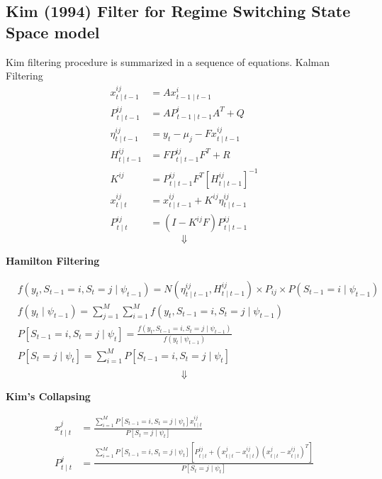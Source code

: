 \documentclass[UTF8,12pt]{ctexart}
\numberwithin{equation}{section}%
\begin{document}
	\subsection{Kim (1994) Filter for Regime Switching State Space model}
	Kim filtering procedure is summarized in a sequence of equations.
	Kalman Filtering
	$$
	\begin{aligned}
		x_{t \mid t-1}^{i j} & =A x_{t-1 \mid t-1}^i \\
		P_{t \mid t-1}^{i j} & =A P_{t-1 \mid t-1}^i A^T+Q \\
		\eta_{t \mid t-1}^{i j} & =y_t-\mu_j-F x_{t \mid t-1}^{i j} \\
		H_{t \mid t-1}^{i j} & =F P_{t \mid t-1}^{i j} F^T+R \\
		K^{i j} & =P_{t \mid t-1}^{i j} F^T\left[H_{t \mid t-1}^{i j}\right]^{-1} \\
		x_{t \mid t}^{i j} & =x_{t \mid t-1}^{i j}+K^{i j} \eta_{t \mid t-1}^{i j} \\
		P_{t \mid t}^{i j} & =\left(I-K^{i j} F\right) P_{t \mid t-1}^{i j} 
	\end{aligned}
	$$
	$$\Downarrow$$
	\begin{center}
		\textbf{Hamilton Filtering}
	\end{center}
	$$
	\begin{aligned}
		& f\left(y_t, S_{t-1}=i, S_t=j \mid \psi_{t-1}\right)=N\left(\eta_{t \mid t-1}^{i j}, H_{t \mid t-1}^{i j}\right) \times P_{i j} \times P\left(S_{t-1}=i \mid \psi_{t-1}\right) \\
		& f\left(y_t \mid \psi_{t-1}\right)=\sum_{j=1}^M \sum_{i=1}^M f\left(y_t, S_{t-1}=i, S_t=j \mid \psi_{t-1}\right) \\
		& P\left[S_{t-1}=i, S_t=j \mid \psi_t\right]=\frac{f\left(y_t, S_{t-1}=i, S_t=j \mid \psi_{t-1}\right)}{f\left(y_t \mid \psi_{t-1}\right)} \\
		& P\left[S_t=j \mid \psi_t\right]=\sum_{i=1}^M P\left[S_{t-1}=i, S_t=j \mid \psi_t\right] \\
	\end{aligned}
	$$
	$$\Downarrow$$
	\begin{center}
	\textbf{Kim's Collapsing}
	\end{center}
	$$
	\begin{aligned}
		x_{t \mid t}^j & =\frac{\sum_{i=1}^M P\left[S_{t-1}=i, S_t=j \mid \psi_t\right] x_{t \mid t}^{i j}}{P\left[S_t=j \mid \psi_t\right]} \\
		P_{t \mid t}^j & =\frac{\sum_{i=1}^M P\left[S_{t-1}=i, S_t=j \mid \psi_t\right]\left[P_{t \mid t}^{i j}+\left(x_{t \mid t}^j-x_{t \mid t}^{i j}\right)\left(x_{t \mid t}^j-x_{t \mid t}^{i j}\right)^T\right]}{P\left[S_t=j \mid \psi_t\right]}
	\end{aligned}
	$$
	
\end{document}
